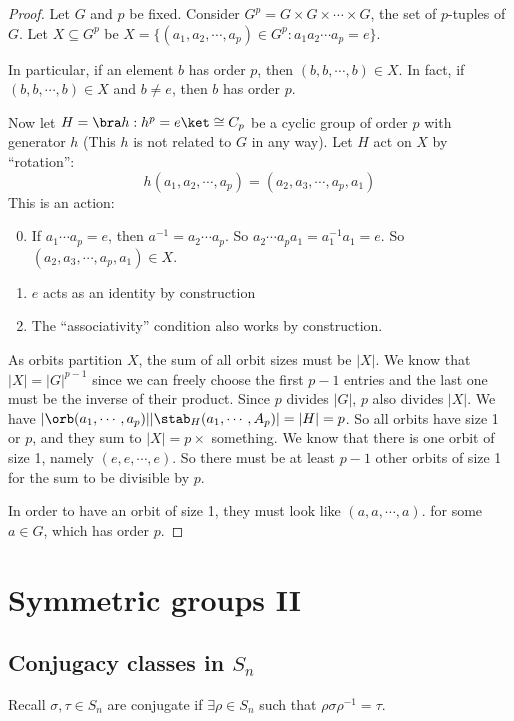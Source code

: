 \documentclass[a4pape]{article}
\begin{document}
\begin{proof}
  Let $G$ and $p$ be fixed. Consider $G^p = G\times G\times \cdots \times G$, the set of $p$-tuples of $G$. Let $X \subseteq G^p$ be $X = \{(a_1, a_2, \cdots, a_p)\in G^p: a_1a_2\cdots a_p = e\}$.

In particular, if an element $b$ has order $p$, then $(b, b, \cdots, b)\in X$. In fact, if $(b, b, \cdots, b)\in X$ and $b\not= e$, then $b$ has order $p$.

Now let $H = \bra h: h^p = e\ket\cong C_p$ be a cyclic group of order $p$ with generator $h$ (This $h$ is not related to $G$ in any way). Let $H$ act on $X$ by ``rotation'':
\[
h(a_1, a_2, \cdots, a_p) = (a_2, a_3, \cdots, a_p, a_1)
\]
This is an action:
\begin{enumerate}[label=\arabic{*}.]
\setcounter{enumi}{-1}
\item If $a_1\cdots a_p = e$, then $a^{-1} = a_2\cdots a_p$. So $a_2\cdots a_pa_1 = a_1^{-1}a_1 = e$. So $(a_2, a_3, \cdots, a_p, a_1)\in X$.
\item $e$ acts as an identity by construction
\item The ``associativity'' condition also works by construction. 
\end{enumerate}

As orbits partition $X$, the sum of all orbit sizes must be $|X|$. We know that $|X| = |G|^{p - 1}$ since we can freely choose the first $p - 1$ entries and the last one must be the inverse of their product. Since $p$ divides $|G|$, $p$ also divides $|X|$. We have $|\orb(a_1, \cdots , a_p)||\stab_H(a_1, \cdots, A_p)| = |H| = p$. So all orbits have size 1 or $p$, and they sum to $|X| = p\times$ something. We know that there is one orbit of size 1, namely $(e, e, \cdots, e)$. So there must be at least $p - 1$ other orbits of size 1 for the sum to be divisible by $p$.

In order to have an orbit of size 1, they must look like ${(a, a, \cdots, a)}$.  for some $a\in G$, which has order $p$.
\end{proof}

\section{Symmetric groups II}
\subsection{Conjugacy classes in \texorpdfstring{$S_n$}{Sn}}
Recall $\sigma, \tau\in S_n$ are conjugate if $\exists \rho\in S_n$ such that $\rho \sigma\rho^{-1} = \tau$.
\end{document}
